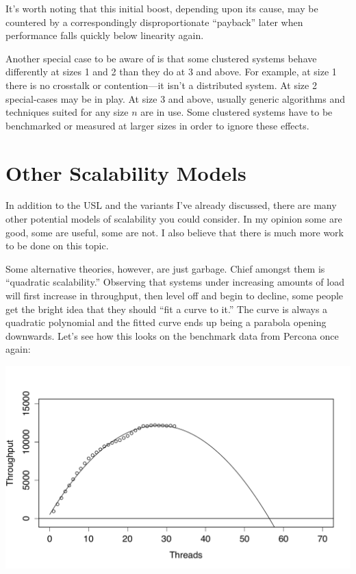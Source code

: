 \documentclass{vivid_layout}
\begin{document}
It's worth noting that this initial boost, depending upon its cause, may be
countered by a correspondingly disproportionate ``payback'' later when
performance falls quickly below linearity again.

Another special case to be aware of is that some clustered systems behave
differently at sizes 1 and 2 than they do at 3 and above. For example, at size 1
there is no crosstalk or contention---it isn't a distributed system. At size 2
special-cases may be in play. At size 3 and above, usually generic algorithms
and techniques suited for any size $n$ are in use. Some clustered systems have
to be benchmarked or measured at larger sizes in order to ignore these effects.

\section{Other Scalability Models}

In addition to the USL and the variants I've already discussed, there are many
other potential models of scalability you could consider. In my opinion some are
good, some are useful, some are not. I also believe that there is much more work
to be done on this topic.

Some alternative theories, however, are just garbage. Chief amongst them is
``quadratic scalability.'' Observing that systems under increasing amounts of
load will first increase in throughput, then level off and begin to decline,
some people get the bright idea that they should ``fit a curve to it.'' The curve
is always a quadratic polynomial and the fitted curve ends up being a parabola
opening downwards. Let's see how this looks on the benchmark data from Percona
once again:
\begin{center}
\includegraphics[width=.85\linewidth]{scalability/quadratic}
\end{center}
\end{document}
